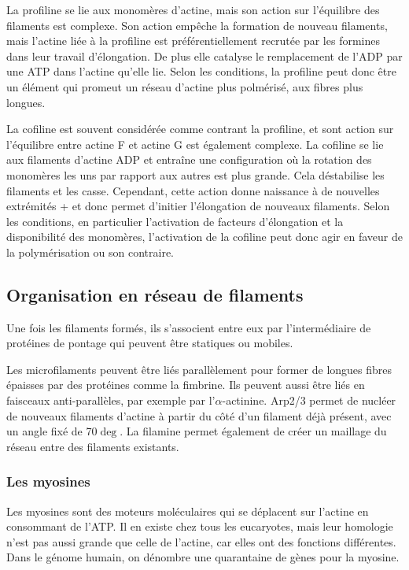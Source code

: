 \documentclass{report}
\begin{document}
La profiline se lie aux monomères d'actine, mais son action sur l'équilibre des filaments est complexe. Son action empêche la formation de nouveau filaments, mais l'actine liée à la profiline est préférentiellement recrutée par les formines dans leur travail d'élongation. De plus elle catalyse le remplacement de l'ADP par une ATP dans l'actine qu'elle lie. Selon les conditions, la profiline peut donc être un élément qui promeut un réseau d'actine plus polmérisé, aux fibres plus longues. 

La cofiline est souvent considérée comme contrant la profiline, et sont action sur l'équilibre entre actine F et actine G est également complexe. La cofiline se lie aux filaments d'actine ADP et entraîne une configuration où la rotation des monomères les uns par rapport aux autres est plus grande. Cela déstabilise les filaments et les casse. 
Cependant, cette action donne naissance à de nouvelles extrémités + et donc permet d'initier l'élongation de nouveaux filaments. 
Selon les conditions, en particulier l'activation de facteurs d'élongation et la disponibilité des monomères, l'activation de la cofiline peut donc agir en faveur de la polymérisation ou son contraire. 



\subsection{Organisation en réseau de filaments}

Une fois les filaments formés, ils s'associent entre eux par l'intermédiaire de protéines de pontage qui peuvent être statiques ou mobiles. 

Les microfilaments peuvent être liés parallèlement pour former de longues fibres épaisses par des protéines comme la fimbrine. Ils peuvent aussi être liés en faisceaux anti-parallèles, par exemple par l'$\alpha$-actinine. 
Arp2/3 permet de nucléer de nouveaux filaments d'actine à partir du côté d'un filament déjà présent, avec un angle fixé de 70$\deg$. La filamine permet également de créer un maillage du réseau entre des filaments existants. 

\subsubsection{Les myosines}

Les myosines sont des moteurs moléculaires qui se déplacent sur l'actine en consommant de l'ATP. Il en existe chez tous les eucaryotes, mais leur homologie n'est pas aussi grande que celle de l'actine, car elles ont des fonctions différentes. Dans le génome humain, on dénombre une quarantaine de gènes pour la myosine. 
\end{document}
